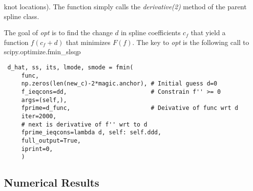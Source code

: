 \documentclass[11pt]{article}
\begin{document}
\begin{description}
\begin{description}
    knot locations).  The function simply calls the
    \emph{derivative(2)} method of the parent spline class.
  \end{description}
  The goal of \emph{opt} is to find the change $d$ in spline
  coefficients $c_f$ that yield a function $f(c_f+d)$ that minimizes $F(f)$.
  The key to \emph{opt} is the following call to
  scipy.optimize.fmin\_slsqp
\begin{verbatim}
 d_hat, ss, its, lmode, smode = fmin(
     func,
     np.zeros(len(new_c)-2*magic.anchor), # Initial guess d=0
     f_ieqcons=dd,                        # Constrain f'' >= 0
     args=(self,),
     fprime=d_func,                       # Deivative of func wrt d
     iter=2000,
     # next is derivative of f'' wrt to d
     fprime_ieqcons=lambda d, self: self.ddd,
     full_output=True,
     iprint=0,
     )
\end{verbatim}

\end{description}

\subsection{Numerical Results}
\label{sec:numerical-results}
\end{document}
